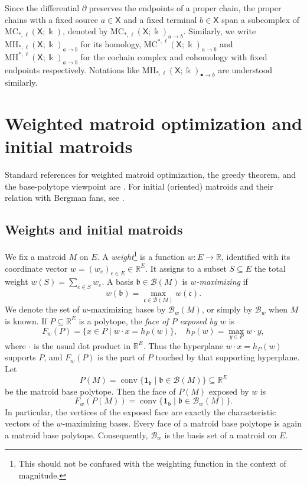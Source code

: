\documentclass[10pt]{amsart}
\theoremstyle{plain}
\theoremstyle{definition}
\newcommand{\one}{\mathbf{1}}
\newcommand{\R}{\mathbb{R}}
\DeclareMathOperator{\conv}{conv}
\newcommand{\B}{\mathcal{B}}
\newcommand{\MC}{\mathrm{MC}}
\newcommand{\MH}{\mathrm{MH}}
\newcommand{\X}{\mathsf{X}}
\newcommand{\kk}{\Bbbk}
\newcommand{\bb}{\mathfrak{b}}
\newcommand{\cc}{\mathfrak{c}}
\begin{document}
Since the differential $\partial$ preserves the endpoints of a proper chain, the proper chains with a fixed source $a\in\X$ and a fixed terminal $b\in\X$ span a subcomplex of $\MC_{*,\ell}(\X;\kk)$, denoted by $\MC_{*,\ell}(\X;\kk)_{a\to b}$. Similarly, we write $\MH_{*,\ell}(\X;\kk)_{a\to b}$ for its homology, $\MC^{*,\ell}(\X;\kk)_{a\to b}$ and $\MH^{*,\ell}(\X;\kk)_{a\to b}$ for the cochain complex and cohomology with fixed endpoints respectively. Notations like $\MH_{*,\ell}(\X;\kk)_{\bullet\to b}$ are understood similarly.






\section{Weighted matroid optimization and initial matroids}\label{matroid-optimization}

Standard references for weighted matroid optimization, the greedy theorem, and the base-polytope viewpoint are \cite{Oxley2011,Schrijver2003}. For initial (oriented) matroids and their relation with Bergman fans, see \cite{Ardila2006,Rau2022,Shaw2026}.

\subsection{Weights and initial matroids}

We fix a matroid $M$ on $E$. A \emph{weight}\footnote{This should not be confused with the weighting function in the context of magnitude.} is a function $w:E\to\R$, identified with its coordinate vector $w=(w_e)_{e\in E}\in\R^E$. It assigns to a subset $S\subseteq E$ the total weight $w(S)=\sum_{e\in S}w_e$. A basis $\bb\in\B(M)$ is \emph{$w$-maximizing} if
\[
w(\bb)=\max_{\cc\in\B(M)}w(\cc).
\]
We denote the set of $w$-maximizing bases by $\B_w(M)$, or simply by $\B_w$ when $M$ is known. If $P\subseteq\R^E$ is a polytope, the \emph{face of $P$ exposed by $w$} is
\[
F_w(P)=\{x\in P \mid w\cdot x=h_P(w)\}, \quad h_P(w)=\max_{y\in P}w\cdot y,
\]
where $\cdot$ is the usual dot product in $\R^E$. Thus the hyperplane $w\cdot x=h_P(w)$ supports $P$, and $F_w(P)$ is the part of $P$ touched by that supporting hyperplane. Let
\[
P(M)=\conv\{\one_{\bb} \mid \bb\in\B(M)\}\subseteq\R^E
\]
be the matroid base polytope. Then the face of $P(M)$ exposed by $w$ is
\[
F_w(P(M))=\conv\{\one_{\bb} \mid \bb\in\B_w(M)\}.
\]
In particular, the vertices of the exposed face are exactly the characteristic vectors of the $w$-maximizing bases. Every face of a matroid base polytope is again a matroid base polytope. Consequently, $\B_w$ is the basis set of a matroid on $E$.
\end{document}
